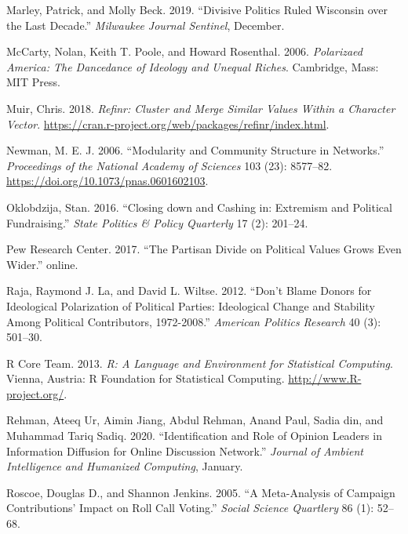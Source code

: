 \documentclass[12pt,]{article}
\begin{document}
\leavevmode\hypertarget{ref-marley2019}{}%
Marley, Patrick, and Molly Beck. 2019. ``Divisive Politics Ruled
Wisconsin over the Last Decade.'' \emph{Milwaukee Journal Sentinel},
December.

\leavevmode\hypertarget{ref-mccarty2006}{}%
McCarty, Nolan, Keith T. Poole, and Howard Rosenthal. 2006.
\emph{Polarizaed America: The Dancedance of Ideology and Unequal
Riches}. Cambridge, Mass: MIT Press.

\leavevmode\hypertarget{ref-refinr}{}%
Muir, Chris. 2018. \emph{Refinr: Cluster and Merge Similar Values Within
a Character Vector}.
\url{https://cran.r-project.org/web/packages/refinr/index.html}.

\leavevmode\hypertarget{ref-newman2006}{}%
Newman, M. E. J. 2006. ``Modularity and Community Structure in
Networks.'' \emph{Proceedings of the National Academy of Sciences} 103
(23): 8577--82. \url{https://doi.org/10.1073/pnas.0601602103}.

\leavevmode\hypertarget{ref-oklobzija}{}%
Oklobdzija, Stan. 2016. ``Closing down and Cashing in: Extremism and
Political Fundraising.'' \emph{State Politics \& Policy Quarterly} 17
(2): 201--24.

\leavevmode\hypertarget{ref-pew2017}{}%
Pew Research Center. 2017. ``The Partisan Divide on Political Values
Grows Even Wider.'' online.

\leavevmode\hypertarget{ref-laraja2011}{}%
Raja, Raymond J. La, and David L. Wiltse. 2012. ``Don't Blame Donors for
Ideological Polarization of Political Parties: Ideological Change and
Stability Among Political Contributors, 1972-2008.'' \emph{American
Politics Research} 40 (3): 501--30.

\leavevmode\hypertarget{ref-r}{}%
R Core Team. 2013. \emph{R: A Language and Environment for Statistical
Computing}. Vienna, Austria: R Foundation for Statistical Computing.
\url{http://www.R-project.org/}.

\leavevmode\hypertarget{ref-rehman2020}{}%
Rehman, Ateeq Ur, Aimin Jiang, Abdul Rehman, Anand Paul, Sadia din, and
Muhammad Tariq Sadiq. 2020. ``Identification and Role of Opinion Leaders
in Information Diffusion for Online Discussion Network.'' \emph{Journal
of Ambient Intelligence and Humanized Computing}, January.

\leavevmode\hypertarget{ref-roscoe2005}{}%
Roscoe, Douglas D., and Shannon Jenkins. 2005. ``A Meta-Analysis of
Campaign Contributions' Impact on Roll Call Voting.'' \emph{Social
Science Quartlery} 86 (1): 52--68.
\end{document}
